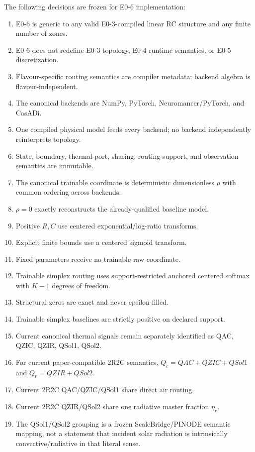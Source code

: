 \documentclass[11pt]{article}
\begin{document}
The following decisions are frozen for E0-6 implementation:
\begin{enumerate}[leftmargin=*]
\item E0-6 is generic to any valid E0-3-compiled linear RC structure and any finite number of zones.
\item E0-6 does not redefine E0-3 topology, E0-4 runtime semantics, or E0-5 discretization.
\item Flavour-specific routing semantics are compiler metadata; backend algebra is flavour-independent.
\item The canonical backends are NumPy, PyTorch, Neuromancer/PyTorch, and CasADi.
\item One compiled physical model feeds every backend; no backend independently reinterprets topology.
\item State, boundary, thermal-port, sharing, routing-support, and observation semantics are immutable.
\item The canonical trainable coordinate is deterministic dimensionless $\rho$ with common ordering across backends.
\item $\rho=0$ exactly reconstructs the already-qualified baseline model.
\item Positive $R,C$ use centered exponential/log-ratio transforms.
\item Explicit finite bounds use a centered sigmoid transform.
\item Fixed parameters receive no trainable raw coordinate.
\item Trainable simplex routing uses support-restricted anchored centered softmax with $K-1$ degrees of freedom.
\item Structural zeros are exact and never epsilon-filled.
\item Trainable simplex baselines are strictly positive on declared support.
\item Current canonical thermal signals remain separately identified as QAC, QZIC, QZIR, QSol1, QSol2.
\item For current paper-compatible 2R2C semantics, $Q_c=QAC+QZIC+QSol1$ and $Q_r=QZIR+QSol2$.
\item Current 2R2C QAC/QZIC/QSol1 share direct air routing.
\item Current 2R2C QZIR/QSol2 share one radiative master fraction $\eta_r$.
\item The QSol1/QSol2 grouping is a frozen ScaleBridge/PINODE semantic mapping, not a statement that incident solar radiation is intrinsically convective/radiative in that literal sense.

\end{enumerate}
\end{document}
